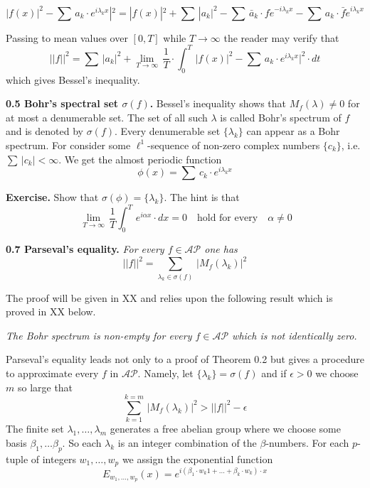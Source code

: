 \documentclass{amsart}
\def\uuu{_}
\def\vvv{-}
\begin{document}
\[
|f(x)|^2\vvv \sum\, a\uuu k\cdot e^{i\lambda\uuu k x}|^2=
|f(x)|^2+\sum\,|a\uuu k|^2\vvv
\sum\, \bar a\uuu k\cdot f\dot e^{\vvv i\lambda\uuu k x}\vvv
\sum\, a\uuu k\cdot \bar f\dot e^{i\lambda\uuu k x}
\]
\medskip


\noindent
Passing to mean values over $[0,T]$ while $T\to \infty$
the reader may verify that
\[
||f||^2=\sum\,|a\uuu k|^2+
\lim\uuu {T\to\infty}\, \frac{1}{T}\cdot \int\uuu 0^T\,
|f(x)|^2\vvv \sum\, a\uuu k\cdot e^{i\lambda\uuu k x}|^2\cdot dt
\]
which  gives Bessel's inequality.

\medskip

\noindent
{\bf{0.5 Bohr's spectral set
$\sigma(f)$.}} Bessel's inequality shows that
$M\uuu f(\lambda)\neq 0$  for at most
a denumerable set. The set of all such $\lambda$ is 
called Bohr's spectrum of $f$ and is
denoted by
$\sigma(f)$.
Every denumerable set
$\{\lambda\uuu k\}$ can appear as a Bohr spectrum.
For consider some $\ell^1$\vvv sequence of non\vvv zero complex numbers
$\{c\uuu k\}$, i.e. $\sum\,|c\uuu k|<\infty$.
We get the almost periodic function
\[ 
\phi(x)= \sum\, c\uuu k\cdot e^{i\lambda\uuu k x}
\]
\medskip

\noindent
{\bf{Exercise.}}
Show that $\sigma(\phi)=\{\lambda\uuu k\}$.
The hint is that
\[ \
\lim\uuu{T\to \infty}\, \frac{1}{T}\int\uuu 0^T\, e^{i\alpha x}\cdot dx=0
\quad\text{hold for every}\quad\alpha\neq 0
\] 




\medskip

\noindent
{\bf{0.7 Parseval's equality.}}
\emph{For every $f\in \mathcal {AP}$ one has}
\[
||f||^2= \sum\uuu {\lambda\uuu k\in \sigma(f)}\, |M\uuu f(\lambda\uuu k)|^2
\]
\medskip

\noindent
The proof will be given in XX and relies upon the following result 
which is proved in XX below.

\medskip

\emph{The Bohr spectrum is non\vvv  empty for every $f\in\mathcal {AP}$
which is not identically zero.}


\bigskip

\noindent{\bf{0.9 Bochner\vvv Fejer kernels.}}
Parseval's equality
leads not only to a proof of Theorem 0.2 but
gives  a   procedure to approximate every
$f$ in $\mathcal{AP}$.
Namely, let $\{\lambda\uuu k\}=\sigma(f)$
and if $\epsilon>0$ we choose $m$ so large that
\[
\sum\uuu{k=1}^{k=m} \, |M\uuu f(\lambda\uuu k)|^2>||f||^2\vvv \epsilon
\]
The finite set $\lambda\uuu 1,\ldots,\lambda\uuu m$
generates a free abelian group where we choose some basis $\beta\uuu 1,\ldots
\beta\uuu p$.
So each $\lambda\uuu k$ is an
integer combination of the $\beta$\vvv numbers.
For each $p$\vvv tuple of integers $w\uuu 1,\ldots,w\uuu p$
we assign the exponential function
\[
E\uuu{w\uuu1,\ldots,w\uuu p}(x)=e^{i(\beta\uuu 1\cdot w\uuu k1+\ldots+
\beta\uuu k\cdot w\uuu k)\cdot x}
\]
\end{document}
